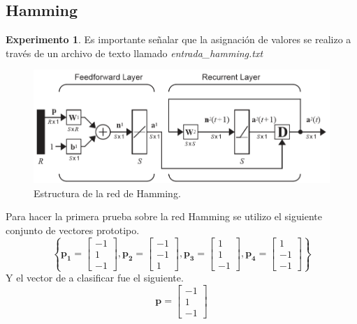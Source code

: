 \documentclass[12pt, titlepage]{article}
\begin{document}
        \subsection{Hamming}
        \textbf{Experimento 1}. Es importante señalar que la asignación de valores se realizo a través de un archivo de texto llamado \emph{entrada\_hamming.txt}
        \begin{figure}[H]
            \begin{center}
                \includegraphics[width=16cm]{img/hamming/diagrama.png}
                \caption{Estructura de la red de Hamming. \cite{libro1}}
                \label{fig:hamming-diagrama2}
            \end{center}
        \end{figure}
        Para hacer la primera prueba sobre la red Hamming se utilizo el siguiente conjunto de vectores prototipo.
        \[ \left\lbrace \boldsymbol{p_1} = \left[\begin{array}{c}-1\\ 1\\ -1\end{array}\right], \boldsymbol{p_2} = \left[\begin{array}{c}-1\\ -1\\ 1\end{array}\right], \boldsymbol{p_3} = \left[\begin{array}{c}1\\ 1\\ -1\end{array}\right], \boldsymbol{p_4} = \left[\begin{array}{c}1\\ -1\\ -1\end{array}\right] \right\rbrace \]
        Y el vector de a clasificar fue el siguiente.
        \[ \boldsymbol{p} = \left[\begin{array}{c}-1\\ 1\\ -1\end{array}\right] \]
\end{document}
